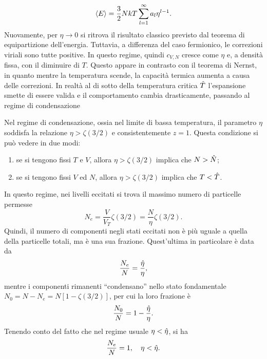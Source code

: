 \begin{caso}
\begin{equation}
        \langle E \rangle = \frac{3}{2}NkT\sum_{l=1}^\infty a_l\eta^{l-1}.
    \end{equation}
    Nuovamente, per $\eta \to 0$ si ritrova il risultato classico previsto dal teorema di equipartizione dell'energia. Tuttavia, a differenza del caso fermionico, le correzioni viriali sono tutte positive. In questo regime, quindi $c_{V,N}$ cresce come $\eta$ e, a densità fissa, con il diminuire di $T$. Questo appare in contrasto con il teorema di Nernst, in quanto mentre la temperatura scende, la capacità termica aumenta a causa delle correzioni. In realtà al di sotto della temperatura critica $\hat{T}$ l'espansione smette di essere valida e il comportamento cambia drasticamente, passando al regime di condensazione
\end{caso}
\begin{caso}
    Nel regime di condensazione, ossia nel limite di bassa temperatura, il parametro $\eta$ soddisfa la relazione $\eta > \zeta(3/2)$ e consistentemente $z = 1$. Questa condizione si può vedere in due modi:
    \begin{enumerate}
        \item se si tengono fissi $T$ e $V$, allora $\eta > \zeta(3/2)$ implica che $N > \hat{N}$;
        \item se si tengono fissi $V$ ed $N$, allora $\eta > \zeta(3/2)$ implica che $T < \hat{T}$.
    \end{enumerate}
    In questo regime, nei livelli eccitati si trova il massimo numero di particelle permesse 
    \begin{equation}
    \label{eq: frazione bosoni eccitati bassa T (grancanonico)}
        N_e = \frac{V}{V_T}\zeta(3/2) = \frac{N}{\eta}\zeta(3/2).
    \end{equation}
    Quindi, il numero di componenti negli stati eccitati non è più uguale a quella della particelle totali, ma è una sua frazione. Quest'ultima in particolare è data da
    \begin{equation}
        \frac{N_e}{N} = \frac{\hat{\eta}}{\eta},
    \end{equation}
    mentre i componenti rimanenti ``condensano'' nello stato fondamentale $N_0 = N - N_e = N[1 - \zeta(3/2)]$, per cui la loro frazione è
    \begin{equation}
         \frac{N_0}{N} = 1 - \frac{\hat{\eta}}{\eta}.
    \end{equation}
    Tenendo conto del fatto che nel regime usuale $\eta < \hat{\eta}$, si ha
    \begin{equation}
        \frac{N_e}{N} = 1, \quad \eta < \hateta.

\end{equation}
\end{caso}
